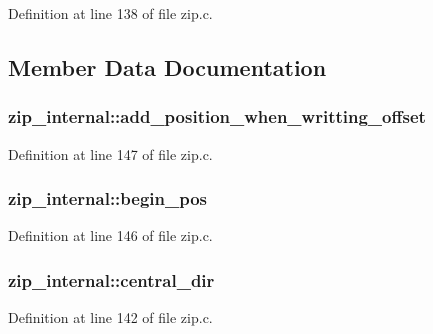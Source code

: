 Definition at line 138 of file zip.\-c.



\subsection{Member Data Documentation}
\hypertarget{structzip__internal_a6cd048a07f19de1144c9a7edc3645422}{
\subsubsection[{add\-\_\-position\-\_\-when\-\_\-writting\-\_\-offset}]{ zip\-\_\-internal\-::add\-\_\-position\-\_\-when\-\_\-writting\-\_\-offset}}\label{structzip__internal_a6cd048a07f19de1144c9a7edc3645422}


Definition at line 147 of file zip.\-c.

\hypertarget{structzip__internal_a913be8e62247a3fbe1ffcdf7c03d0248}{
\subsubsection[{begin\-\_\-pos}]{ zip\-\_\-internal\-::begin\-\_\-pos}}\label{structzip__internal_a913be8e62247a3fbe1ffcdf7c03d0248}


Definition at line 146 of file zip.\-c.

\hypertarget{structzip__internal_ae63acf37b5a3719b3eae7802115ed73c}{
\subsubsection[{central\-\_\-dir}]{ zip\-\_\-internal\-::central\-\_\-dir}}\label{structzip__internal_ae63acf37b5a3719b3eae7802115ed73c}


Definition at line 142 of file zip.\-c.

